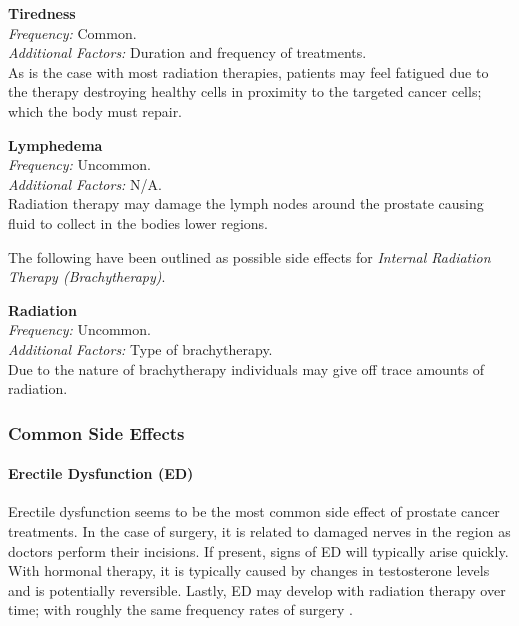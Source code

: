 \documentclass[journal]{vgtc}                %
\begin{document}
                        \textbf{Tiredness}
                        \\ \textit{Frequency:} Common.
                        \\ \textit{Additional Factors:} Duration and frequency of treatments.
                        \\ As is the case with most radiation therapies, patients may feel fatigued due to the therapy destroying healthy cells in proximity to the targeted cancer cells; which the body must repair. \cite{RadiationTherapy:2005}
                        \newline

                        \textbf{Lymphedema}
                        \\ \textit{Frequency:} Uncommon.
                        \\ \textit{Additional Factors:} N/A.
                        \\ Radiation therapy may damage the lymph nodes around the prostate causing fluid to collect in the bodies lower regions. \cite{RadiationTherapy:2005}
                        \newline

                        The following have been outlined as possible side effects for \textit{Internal Radiation Therapy (Brachytherapy)}.
                        \newline

                        \textbf{Radiation}
                        \\ \textit{Frequency:} Uncommon.
                        \\ \textit{Additional Factors:} Type of brachytherapy.
                        \\ Due to the nature of brachytherapy individuals may give off trace amounts of radiation. \cite{RadiationTherapy:2005}
                        \newline

                \subsubsection{Common Side Effects}
                        \paragraph{Erectile Dysfunction (ED)}
                                Erectile dysfunction seems to be the most common side effect of prostate cancer treatments.
                                In the case of surgery, it is related to damaged nerves in the region as doctors perform their incisions. If present, signs of ED will typically arise quickly.
                                With hormonal therapy, it is typically caused by changes in testosterone levels and is potentially reversible.
                                Lastly, ED may develop with radiation therapy over time; with roughly the same frequency rates of surgery \cite{RadiationTherapy:2005}.
\end{document}
